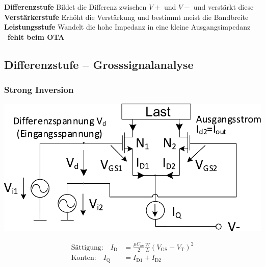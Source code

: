 \begin{outline}
    \1 \textbf{Differenzstufe}
        \2 Bildet die Differenz zwischen $V+$ und $V-$ und verstärkt diese
    \1 \textbf{Verstärkerstufe}
        \2 Erhöht die Verstärkung und bestimmt meist die Bandbreite
    \1 \textbf{Leistungsstufe}
        \2 Wandelt die hohe Impedanz in eine kleine Ausgangsimpedanz
            \textrightarrow\ \textbf{fehlt beim OTA}
\end{outline}






\subsection{Differenzstufe -- Grosssignalanalyse\label{opamp:diff.stufe:grossignal}}

\subsubsection{Strong Inversion}

\begin{minipage}[t]{0.48\columnwidth}
    \includegraphics[width=\columnwidth, align=t]{images/09_differenzstufe_grosssignalanalyse.pdf}
\end{minipage}
\hfill
\begin{minipage}[t]{0.48\columnwidth}
    \begin{align*}
        \text{Sättigung:} \quad     I_\text{D}  &= \frac{\mu C_\text{ox}}{2} \frac{W}{L} (V_\text{GS} - V_\text{T})^2    \\
        \text{Konten:} \quad        I_\text{Q}  &= I_\text{D1} + I_\text{D2} 
    \end{align*}
\end{minipage}

